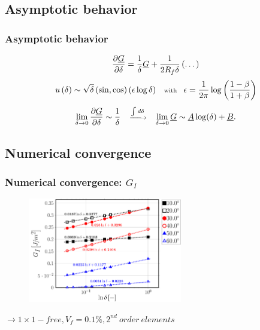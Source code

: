 \documentclass[first,firstsupp,lastsupp,last,hyperref,table]{ETHclass}
\begin{document}
\subsection{Asymptotic behavior}

\begin{frame}
\frametitle{\vspace{0.25cm}\small Asymptotic behavior}
\vspace{-1.25cm}
\centering
\begin{equation*}
\scriptsize
\frac{\partial \underline{G}}{\partial \delta}=\frac{1}{\delta}\underline{G}+\frac{1}{2R_{f}\delta}\left(\dots\right)
\end{equation*}
\begin{equation*}
\scriptsize
u\left(\delta\right)\sim \sqrt{\delta}\left(\sin,\cos\right)\left(\epsilon\log{\delta}\right)\quad\text{with}\quad\epsilon=\frac{1}{2\pi}\log{\left(\frac{1-\beta}{1+\beta}\right)}
\end{equation*}
\begin{equation*}
\scriptsize
\lim_{\delta\rightarrow 0}\frac{\partial \underline{G}}{\partial \delta}\sim\frac{1}{\delta}\quad\xrightarrow{\int d\delta}\quad\lim_{\delta\rightarrow 0}\underline{G}\sim \underline{A}\log(\delta)+\underline{B}.
\end{equation*}
\end{frame}

\subsection{Numerical convergence}

%

\begin{frame}
\frametitle{\vspace{0.25cm}\small Numerical convergence: $G_{I}$}
\vspace{-.75cm}
\centering
\begin{figure}
\centering
\includegraphics[width=0.6\textwidth]{Vf0_1-free-2nd-semilogvsDelta-GI.pdf}
\end{figure}
$\rightarrow 1\times1-free, V_{f}=0.1\%, 2^{nd}\ order\ elements$ 
\end{frame}
\end{document}
